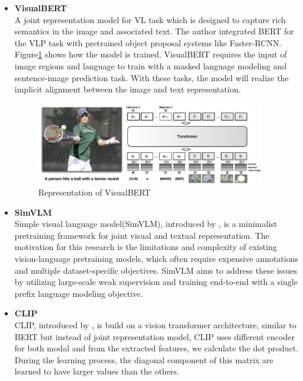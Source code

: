 
\begin{itemize}
    \item \textbf{VisualBERT}\\
    A joint representation model for VL task which is designed to capture rich semantics in the image and associated text. The author integrated BERT for the VLP task with pretrained object proposal systems like Faster-RCNN. Figure\ref{fig:visualvert} shows how the model is trained. VisualBERT requires the input of image regions and language to train with a masked language modeling and sentence-image prediction task. With these tasks, the model will realize the implicit alignment between the image and text representation.
    \begin{figure}[htbp]
        \begin{center}
            \includegraphics[width=10cm]{img/VisualBERT.png}
            \caption{Representation of VisualBERT}\label{fig:visualvert}
        \end{center}
    \end{figure}

    \item \textbf{SimVLM}\\
    Simple visual language model(SimVLM), introduced by \cite{wang2022simvlm}, is a minimalist pretraining framework for joint visual and textual representation. The motivation for this research is the limitations and complexity of existing vision-language pretraining models, which often require expensive annotations and multiple dataset-specific objectives. SimVLM aims to address these issues by utilizing large-scale weak supervision and training end-to-end with a single prefix language modeling objective.


    \item \textbf{CLIP}\\
    CLIP, introduced by \cite{radford2021learning}, is build on a vision transformer architecture, similar to BERT but instead of joint representation model, CLIP uses different encoder for both modal and from the extracted features, we calculate the dot product. During the learning process, the diagonal component of this matrix are learned to have larger values than the others.
    
\end{itemize}


